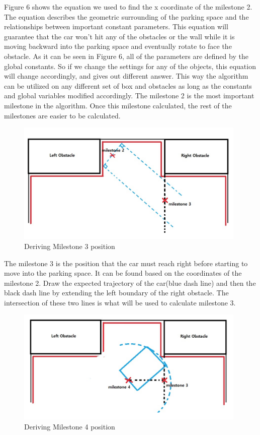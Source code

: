 \documentclass[12pt, letterpaper]{amsart} %
\numberwithin{equation}{section}
\begin{document}
Figure 6 shows the equation we used to find the x 
coordinate of the milestone 2. The equation describes 
the geometric surrounding of the parking space and the
relationships between important constant parameters.
This equation will guarantee that the car won’t hit any
of the obstacles or the wall while it is moving backward into the parking space and eventually rotate to face the obstacle.
As it can be seen in Figure 6, all of the parameters 
are defined by the global constants. So if we change 
the settings for any of the objects, this equation will 
change accordingly, and gives out different answer.
This way the algorithm can be utilized on any different set of box and obstacles as long as the constants and global variables modified accordingly. 
The milestone 2 is the most important milestone in the algorithm. Once this milestone calculated, the rest of the milestones are easier to be calculated. 

\begin{figure}[h!]
\includegraphics[width=110mm]{fig_10.png}
\caption{Deriving Milestone 3 position}
\label{fig:figure10}	
\end{figure}

The milestone 3 is the position that the car must reach right before starting to move into the parking space. It can be found based on the coordinates of the milestone 2. 
Draw the expected trajectory of the car(blue dash line) and then the black dash line by extending the left boundary of the right obstacle. The intersection of these two lines is what will be used to calculate milestone 3. 
\newpage
\begin{figure}[h!]
\includegraphics[width=110mm]{fig_11.png}
\caption{Deriving Milestone 4 position}
\label{fig:figure11}	
\end{figure}
\end{document}
